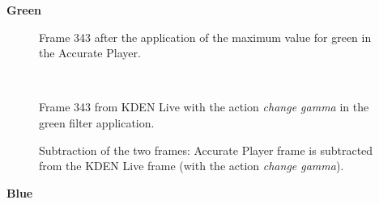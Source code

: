 \documentclass[../MasterThesis.tex]{subfiles}
\begin{document}
\textbf{Green}

\vspace*{-1em}

\begin{minipage}{0.48\textwidth}
	\begin{figure}[H]
		\begin{center}
			\caption[Frame 343 after the application of the green filter in the Accurate Player.]{Frame 343 after the application of the maximum value for green in the Accurate Player.}
		\end{center}
	\end{figure}
\end{minipage}\begin{minipage}{0.04\textwidth}
	\ 
\end{minipage}\begin{minipage}{0.48\textwidth}
	\begin{figure}[H]
		\begin{center}
			\caption[Frame 343 from KDEN Live with the action \textit{change gamma}.]{Frame 343 from KDEN Live with the action \textit{change gamma} in the green filter application.}
		\end{center}
	\end{figure}
\end{minipage}

\vspace*{-1em}

\begin{figure}[H]
	\begin{center}
		\caption[Subtraction of KDEN Live (\textit{change gamma}) and Accurate Player.]{Subtraction of the two frames: Accurate Player frame is subtracted from the KDEN Live frame (with the action \textit{change gamma}).}
	\end{center}
\end{figure}







\vspace*{-1em}

\textbf{Blue}

\vspace*{-1em}
\end{document}
